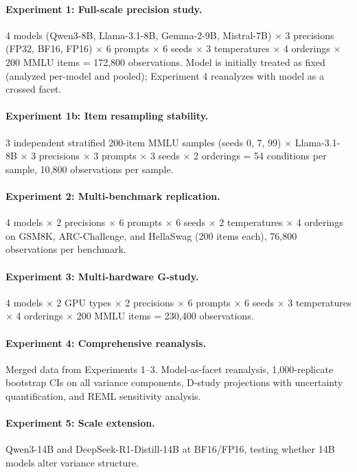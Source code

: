 \documentclass[11pt]{article}
\begin{document}
\paragraph{Experiment 1: Full-scale precision study.}
4 models (Qwen3-8B, Llama-3.1-8B, Gemma-2-9B, Mistral-7B) $\times$ 3 precisions (FP32, BF16, FP16) $\times$ 6 prompts $\times$ 6 seeds $\times$ 3 temperatures $\times$ 4 orderings $\times$ 200 MMLU items = 172{,}800 observations.
Model is initially treated as fixed (analyzed per-model and pooled); Experiment 4 reanalyzes with model as a crossed facet.

\paragraph{Experiment 1b: Item resampling stability.}
3 independent stratified 200-item MMLU samples (seeds 0, 7, 99) $\times$ Llama-3.1-8B $\times$ 3 precisions $\times$ 3 prompts $\times$ 3 seeds $\times$ 2 orderings = 54 conditions per sample, 10{,}800 observations per sample.

\paragraph{Experiment 2: Multi-benchmark replication.}
4 models $\times$ 2 precisions $\times$ 6 prompts $\times$ 6 seeds $\times$ 2 temperatures $\times$ 4 orderings on GSM8K, ARC-Challenge, and HellaSwag (200 items each), 76{,}800 observations per benchmark.

\paragraph{Experiment 3: Multi-hardware G-study.}
4 models $\times$ 2 GPU types $\times$ 2 precisions $\times$ 6 prompts $\times$ 6 seeds $\times$ 3 temperatures $\times$ 4 orderings $\times$ 200 MMLU items = 230{,}400 observations.

\paragraph{Experiment 4: Comprehensive reanalysis.}
Merged data from Experiments 1--3. Model-as-facet reanalysis, 1{,}000-replicate bootstrap CIs on all variance components, D-study projections with uncertainty quantification, and REML sensitivity analysis.

\paragraph{Experiment 5: Scale extension.}
Qwen3-14B and DeepSeek-R1-Distill-14B at BF16/FP16, testing whether 14B models alter variance structure.
\end{document}
